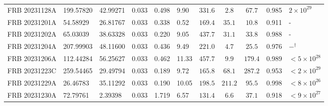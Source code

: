 \begin{longtable}{lllllllccll}
FRB 20231128A & 199.57820 & 42.99271 & 0.033 & 0.498 & 9.90 & $331.6$ & $2.8$ & $67.7$ & 0.985 & $ 2\times10^{29}$ \\
FRB 20231201A & 54.58929 & 26.81767 & 0.033 & 0.338 & 0.52 & $169.4$ & $35.1$ & $10.8$ & 0.911 & - \\
FRB 20231202A & 65.03039 & 38.63328 & 0.033 & 0.220 & 9.05 & $437.7$ & $31.1$ & $33.8$ & 0.988 & - \\
FRB 20231204A & 207.99903 & 48.11600 & 0.033 & 0.436 & 9.49 & $221.0$ & $4.7$ & $25.5$ & 0.976 & $-^\dagger$ \\
FRB 20231206A & 112.44284 & 56.25627 & 0.033 & 0.462 & 11.33 & $457.7$ & $9.9$ & $179.4$ & 0.989 & $<5\times10^{28}$ \\
FRB 20231223C & 259.54465 & 29.49794 & 0.033 & 0.189 & 9.72 & $165.8$ & $68.1$ & $287.2$ & 0.953 & $<2\times10^{29}$ \\
FRB 20231229A & 26.46783 & 35.11292 & 0.033 & 0.190 & 10.05 & $198.5$ & $211.2$ & $95.5$ & 0.998 & $<8\times10^{26}$ \\
FRB 20231230A & 72.79761 & 2.39398 & 0.033 & 1.719 & 6.57 & $131.4$ & $6.6$ & $37.1$ & 0.918 & $<9\times10^{27}$ \\
\end{longtable}
